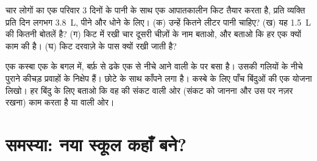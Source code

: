 \begin{exercise}[$\star\star\star$]\label{exo:g9:natural-risks:11}
चार लोगों का एक परिवार 3 दिनों के पानी के साथ एक आपातकालीन किट तैयार करता है, प्रति व्यक्ति
प्रति दिन लगभग \qty{3.8}{L}, पीने और धोने के लिए। (क) उन्हें कितने लीटर पानी चाहिए?
(ख) यह \qty{1.5}{L} की कितनी बोतलें है? (ग) किट में रखी चार दूसरी चीज़ों के नाम बताओ,
और बताओ कि हर एक क्यों काम की है। (घ) किट दरवाज़े के पास क्यों रखी जाती
है?
\end{exercise}

\begin{exercise}[$\star\star\star$]\label{exo:g9:natural-risks:12}
एक कस्बा एक  के बगल में, बर्फ़ से ढके एक  से नीचे आने वाली  के  पर
बसा है। उसकी गलियों के नीचे पुराने कीचड़ प्रवाहों के निक्षेप हैं।  छोटे  के
साथ काँपने लगा है। कस्बे के लिए पाँच बिंदुओं की एक  योजना लिखो। हर बिंदु के लिए
बताओ कि वह  की संकट वाली ओर (संकट को जानना और उस पर नज़र रखना) काम करता है या
 वाली
ओर।
\end{exercise}

\section{समस्या: नया स्कूल कहाँ बने?}

